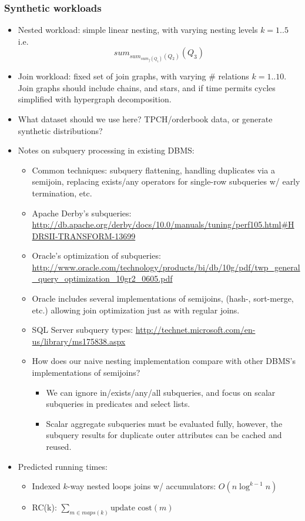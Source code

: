 \documentclass{sig-alternate}
\begin{document}
\subsubsection{Synthetic workloads}
\begin{itemize}
\item Nested workload: simple linear nesting, with varying nesting levels $k=1..5$ i.e.
\[sum_{sum_{sum_{f}(Q_1)}(Q_2)}(Q_3)\]

\item Join workload: fixed set of join graphs, with varying \# relations
  $k=1..10$. Join graphs should include chains, and stars, and if time permits
  cycles simplified with hypergraph decomposition.

\item What dataset should we use here? TPCH/orderbook data, or generate
  synthetic distributions?

\item Notes on subquery processing in existing DBMS:
    \begin{itemize}
    \item Common techniques: subquery flattening, handling duplicates via a
    semijoin, replacing exists/any operators for single-row subqueries w/ early termination, etc.
    \item Apache Derby's subqueries:
    \url{http://db.apache.org/derby/docs/10.0/manuals/tuning/perf105.html#HDRSII-TRANSFORM-13699}
    \item Oracle's optimization of subqueries:
    \url{http://www.oracle.com/technology/products/bi/db/10g/pdf/twp_general_query_optimization_10gr2_0605.pdf}
    \item Oracle includes several implementations of semijoins, (hash-, sort-merge,
    etc.) allowing join optimization just as with regular joins.
    \item SQL Server subquery types:
    \url{http://technet.microsoft.com/en-us/library/ms175838.aspx}
    \item How does our naive nesting implementation compare with other DBMS's
    implementations of semijoins?
        \begin{itemize}
        \item We can ignore in/exists/any/all subqueries, and focus on scalar subqueries in predicates
        and select lists.
        \item Scalar aggregate subqueries must be evaluated fully, however, the subquery results for
        duplicate outer attributes can be cached and reused.
        \end{itemize}
    \end{itemize}

\item Predicted running times:
    \begin{itemize}
    \item Indexed $k$-way nested loops joins w/ accumulators: $O(n\log^{k-1}{n})$
    \item RC(k): $\sum_{m \in maps(k)} {\mbox{update cost}(m)}$
    \end{itemize}
\end{itemize}
\end{document}
